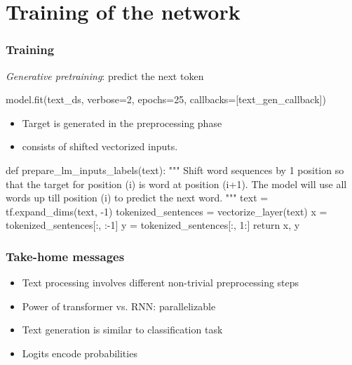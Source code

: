 \documentclass[17pt,institute=e10]{tuhh_presentation}
\begin{document}
\section{Training of the network}
\begin{frame}[fragile]
  \frametitle{Training}
\vspace{-1cm}
  \emph{Generative pretraining}: predict the next token
  \vspace{1cm}
  \begin{python}
  model.fit(text_ds, verbose=2, epochs=25, callbacks=[text_gen_callback])
  \end{python}
  \pause
\vspace{1cm}
\begin{itemize}
  \item Target is generated in the preprocessing phase 
  \item consists of shifted vectorized inputs.
\end{itemize}
\vspace{1cm}
  \begin{python}
  def prepare_lm_inputs_labels(text):
    """
    Shift word sequences by 1 position so that the target for position (i) is
    word at position (i+1). The model will use all words up till position (i)
    to predict the next word.
    """
    text = tf.expand_dims(text, -1)
    tokenized_sentences = vectorize_layer(text)
    x = tokenized_sentences[:, :-1]
    y = tokenized_sentences[:, 1:]
    return x, y
  \end{python}

\end{frame}

\begin{frame}
  \frametitle{Take-home messages}
  \begin{itemize}
    \item Text processing involves different non-trivial preprocessing steps
    \item Power of transformer vs. RNN: parallelizable 
    \item Text generation is similar to classification task
    \item Logits encode probabilities 
  \end{itemize}
\end{frame}
\end{document}
